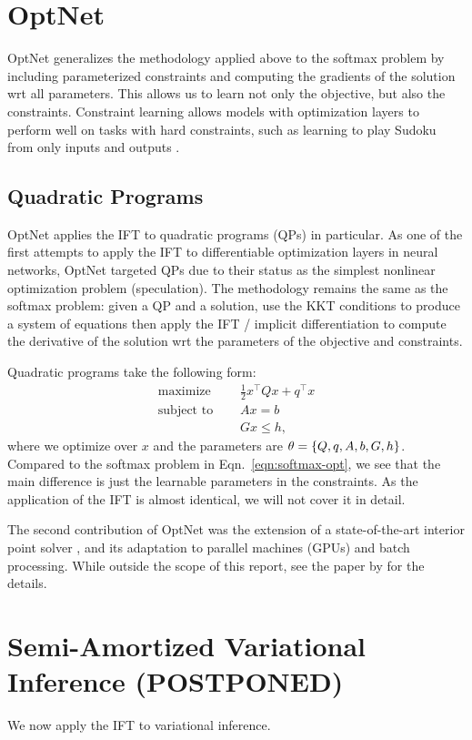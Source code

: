 \documentclass[11pt]{article}
\begin{document}
\section{OptNet}
OptNet generalizes the methodology applied above to the softmax problem by
including parameterized constraints and computing the gradients of the solution
wrt all parameters.
This allows us to learn not only the objective, but also the constraints.
Constraint learning allows models with optimization layers to perform well
on tasks with hard constraints, such as learning to play
Sudoku from only inputs and outputs \citep{optnet}.

\subsection{Quadratic Programs}
OptNet applies the IFT to quadratic programs (QPs) in particular.
As one of the first attempts to apply the IFT to differentiable optimization layers in
neural networks, OptNet targeted QPs due to their status
as the simplest nonlinear optimization problem (speculation).
The methodology remains the same as the softmax problem:
given a QP and a solution,
use the KKT conditions to produce a system of equations then apply the IFT
/ implicit differentiation to compute the derivative of the solution wrt the
parameters of the objective and constraints.

Quadratic programs take the following form:
\begin{equation}
\label{eqn:qp}
\begin{aligned}
\textrm{maximize } \quad & \frac12 x^\top Q x + q^\top x\\
\textrm{subject to } \quad & Ax = b\\
& Gx \leq h,
\end{aligned}
\end{equation}
where we optimize over $x$ and the parameters are $\theta = \left\{Q, q, A, b, G, h\right\}$.
Compared to the softmax problem in Eqn.~\ref{eqn:softmax-opt},
we see that the main difference is just the learnable parameters in the constraints.
As the application of the IFT is almost identical, we will not cover it in detail.

The second contribution of OptNet was the extension of a state-of-the-art interior point
solver \citep{optnet}, and its adaptation to parallel machines (GPUs) and batch processing.
While outside the scope of this report, see the paper by \citet{optnet} for the details.

\section{Semi-Amortized Variational Inference (POSTPONED)}
We now apply the IFT to variational inference.
\end{document}
